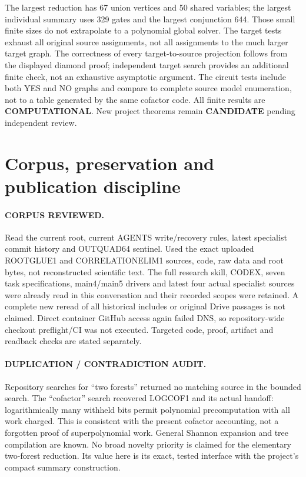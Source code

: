 \documentclass[11pt]{article}
\begin{document}
The largest reduction has 67 union vertices and 50 shared variables; the
largest individual summary uses 329 gates and the largest conjunction 644.
Those small finite sizes do not extrapolate to a polynomial global solver.
The target tests exhaust all original source assignments, not all assignments
to the much larger target graph. The correctness of every target-to-source
projection follows from the displayed diamond proof; independent target search
provides an additional finite check, not an exhaustive asymptotic argument.
The circuit tests include both YES and NO graphs and compare to complete
source model enumeration, not to a table generated by the same cofactor code.
All finite results are \textbf{COMPUTATIONAL}. New project theorems remain
\textbf{CANDIDATE} pending independent review.

\section{Corpus, preservation and publication discipline}
\paragraph{CORPUS REVIEWED.}
Read the current root, current AGENTS write/recovery rules, latest specialist
commit history and OUTQUAD64 sentinel. Used the exact uploaded ROOTGLUE1 and
CORRELATIONELIM1 sources, code, raw data and root bytes, not reconstructed
scientific text. The full research skill, CODEX, seven task specifications,
main4/main5 drivers and latest four actual specialist sources were already
read in this conversation and their recorded scopes were retained. A complete
new reread of all historical includes or original Drive passages is not claimed.
Direct container GitHub access again failed DNS, so repository-wide checkout
preflight/CI was not executed. Targeted code, proof, artifact and readback
checks are stated separately.

\paragraph{DUPLICATION / CONTRADICTION AUDIT.}
Repository searches for ``two forests'' returned no matching source in the
bounded search. The ``cofactor'' search recovered LOGCOF1 and its actual
handoff: logarithmically many withheld bits permit polynomial precomputation
with all work charged. This is consistent with the present cofactor accounting,
not a forgotten proof of superpolynomial work. General Shannon expansion and
tree compilation are known. No broad novelty priority is claimed for the
elementary two-forest reduction. Its value here is its exact, tested interface
with the project's compact summary construction.
\end{document}
